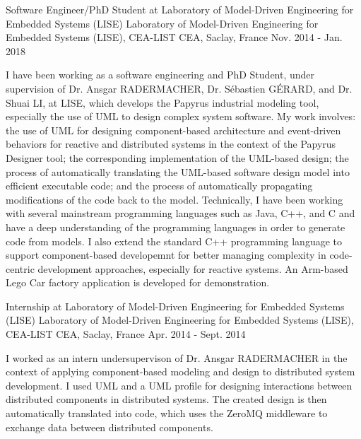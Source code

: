 
\begin{cventries}

\cventry
{Software Engineer/PhD Student at Laboratory of Model-Driven Engineering for Embedded Systems (LISE)} %
{Laboratory of Model-Driven Engineering for Embedded Systems (LISE), CEA-LIST} %
{CEA, Saclay, France} %
{Nov. 2014 - Jan. 2018} %
{ %
	\begin{cvitems}
		\item {I have been working as a software engineering and PhD Student, under supervision of Dr. Ansgar RADERMACHER, Dr. S\'ebastien G\'ERARD, and Dr. Shuai LI, at LISE, which develops the Papyrus industrial modeling tool, especially the use of UML to design complex system software. My work involves: the use of UML for designing component-based architecture and event-driven behaviors for reactive and distributed systems in the context of the Papyrus Designer tool; the corresponding implementation of the UML-based design; the process of automatically translating the UML-based software design model into efficient executable code; and the process of automatically propagating modifications of the code back to the model. Technically, I have been working with several mainstream programming languages such as Java, C++, and C and have a deep understanding of the programming languages in order to generate code from models. I also extend the standard C++ programming language to support component-based developemnt for better managing complexity in code-centric development approaches, especially for reactive systems. An Arm-based Lego Car factory application is developed for demonstration.}		
	\end{cvitems}
}


\cventry
{Internship at Laboratory of Model-Driven Engineering for Embedded Systems (LISE)} %
{Laboratory of Model-Driven Engineering for Embedded Systems (LISE), CEA-LIST} %
{CEA, Saclay, France} %
{Apr. 2014 - Sept. 2014} %
{ %
	\begin{cvitems}
		\item {I worked as an intern undersupervison of Dr. Ansgar RADERMACHER in the context of applying component-based modeling and design to distributed system development. I used UML and a UML profile for designing interactions between distributed components in distributed systems. The created design is then automatically translated into code, which uses the ZeroMQ middleware to exchange data between distributed components.}		
	\end{cvitems}
}



\end{cventries}
